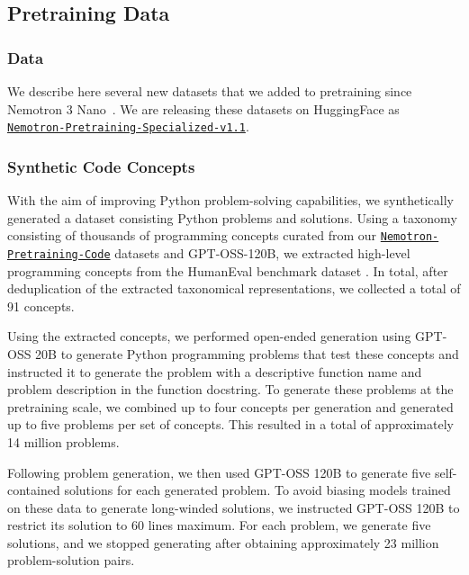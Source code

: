 \subsection{Pretraining Data}
\label{sec:pretrain_data}

\subsubsection{Data}

We describe here several new datasets that we added to pretraining since Nemotron 3 Nano~\citep{nvidia2025nemotron3nanoopen}. We are releasing these datasets on HuggingFace as  \href{https://huggingface.co/datasets/nvidia/Nemotron-Pretraining-Specialized-v1.1}{\texttt{Nemotron-Pretraining-Specialized-v1.1}}.

\subsubsection{Synthetic Code Concepts}
With the aim of improving Python problem-solving capabilities, we synthetically generated a dataset consisting Python problems and solutions. Using a taxonomy consisting of thousands of programming concepts curated from our \href{https://huggingface.co/datasets/nvidia/Nemotron-Pretraining-code-v1}{\texttt{Nemotron-Pretraining-Code}} datasets and GPT-OSS-120B, we extracted high-level programming concepts from the HumanEval benchmark dataset \citep{chen2021evaluatinglargelanguagemodels}. In total, after deduplication of the extracted taxonomical representations, we collected a total of 91 concepts.

Using the extracted concepts, we performed open-ended generation using GPT-OSS 20B to generate Python programming problems that test these concepts and instructed it to generate the problem with a descriptive function name and problem description in the function docstring. To generate these problems at the pretraining scale, we combined up to four concepts per generation and generated up to five problems per set of concepts. This resulted in a total of approximately 14 million problems.

Following problem generation, we then used GPT-OSS 120B to generate five self-contained solutions for each generated problem. To avoid biasing models trained on these data to generate long-winded solutions, we instructed GPT-OSS 120B to restrict its solution to 60 lines maximum. For each problem, we generate five solutions, and we stopped generating after obtaining approximately 23 million problem-solution pairs.


